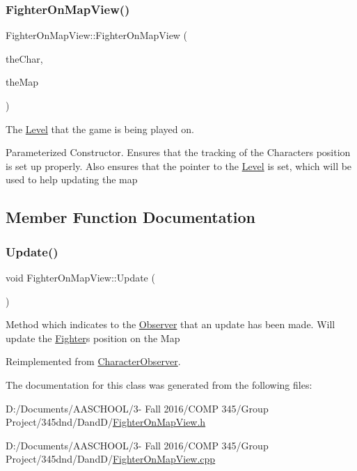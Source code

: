 \subsubsection{\texorpdfstring{Fighter\+On\+Map\+View()}{FighterOnMapView()}}
{\footnotesize\ttfamily Fighter\+On\+Map\+View\+::\+Fighter\+On\+Map\+View (\begin{DoxyParamCaption}\item[{\hyperlink{class_characters}{Characters} $\ast$}]{the\+Char,  }\item[{\hyperlink{class_pre_built_level}{Pre\+Built\+Level} $\ast$}]{the\+Map }\end{DoxyParamCaption})}



The \hyperlink{class_level}{Level} that the game is being played on. 

Parameterized Constructor. Ensures that the tracking of the Character\textquotesingle{}s position is set up properly. Also ensures that the pointer to the \hyperlink{class_level}{Level} is set, which will be used to help updating the map 

\subsection{Member Function Documentation}
\hypertarget{class_fighter_on_map_view_a7f091d8f5f3c46f7a7670c46210673bc}{}\label{class_fighter_on_map_view_a7f091d8f5f3c46f7a7670c46210673bc} 
\subsubsection{\texorpdfstring{Update()}{Update()}}
{\footnotesize\ttfamily void Fighter\+On\+Map\+View\+::\+Update (\begin{DoxyParamCaption}{ }\end{DoxyParamCaption})\hspace{0.3cm}{\ttfamily [virtual]}}

Method which indicates to the \hyperlink{class_observer}{Observer} that an update has been made. Will update the \hyperlink{class_fighter}{Fighter}\textquotesingle{}s position on the Map 

Reimplemented from \hyperlink{class_character_observer_a398d6d784065c7ed36c928d44a574630}{Character\+Observer}.



The documentation for this class was generated from the following files\+:\begin{DoxyCompactItemize}
\item 
D\+:/\+Documents/\+A\+A\+S\+C\+H\+O\+O\+L/3-\/ Fall 2016/\+C\+O\+M\+P 345/\+Group Project/345dnd/\+Dand\+D/\hyperlink{_fighter_on_map_view_8h}{Fighter\+On\+Map\+View.\+h}\item 
D\+:/\+Documents/\+A\+A\+S\+C\+H\+O\+O\+L/3-\/ Fall 2016/\+C\+O\+M\+P 345/\+Group Project/345dnd/\+Dand\+D/\hyperlink{_fighter_on_map_view_8cpp}{Fighter\+On\+Map\+View.\+cpp}\end{DoxyCompactItemize}
